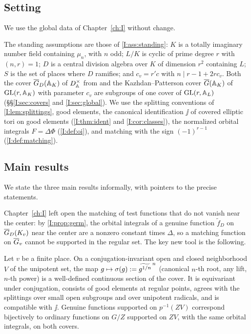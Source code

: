 \subsection{Setting}
We use the global data of Chapter~\ref{ch:I} without change.

The standing assumptions are those of \cref{I:ass:standing}: $K$ is a totally imaginary number field containing $\mu_n$, with $n$ odd; $L/K$ is cyclic of prime degree $r$ with $(n,r)=1$; $D$ is a central division algebra over $K$ of dimension $r^2$ containing $L$; $S$ is the set of places where $D$ ramifies; and $c_v=r'c$ with $n\mid r-1+2rc_v$. Both the cover $\overline{G}_D(\mathbb{A}_K)$ of $D^\times_{\mathbb{A}}$ from \cite[\S6]{JC26a} and the Kazhdan--Patterson cover $\overline{G}(\mathbb{A}_K)$ of $\mathrm{GL}(r,\mathbb{A}_K)$ with parameter $c_v$ are subgroups of one cover of $\mathrm{GL}(r,\mathbb{A}_L)$ (\S\S\ref{I:sec:covers} and \ref{I:sec:global}). We use the splitting conventions of \cref{I:lem:splittings}, good elements, the canonical identification $\jj$ of covered elliptic tori on good elements (\cref{I:thm:ident} and \cref{I:cor:classes}), the normalized orbital integrals $F=\Delta\Phi$ (\cref{I:def:oi}), and matching with the sign $(-1)^{r-1}$ (\cref{I:def:matching}).

\subsection{Main results}\label{II:subsec:main}
We state the three main results informally, with pointers to the precise statements.

Chapter~\ref{ch:I} left open the matching of test functions that do not vanish near the center: by \cref{I:prop:germ}, the orbital integrals of a genuine function $\tilde f_D$ on $\overline{G}_D(K_v)$ near the center are a nonzero constant times $\Delta$, so a matching function on $\overline{G}_v$ cannot be supported in the regular set. The key new tool is the following.

\begin{theoremD}
Let $v$ be a finite place. On a conjugation-invariant open and closed neighborhood $V$ of the unipotent set, the map $g\mapsto\sigma(g):=\widetilde{g^{1/n}}^{\,n}$ (canonical $n$-th root, any lift, $n$-th power) is a well-defined continuous section of the cover. It is equivariant under conjugation, consists of good elements at regular points, agrees with the splittings over small open subgroups and over unipotent radicals, and is compatible with $\jj$. Genuine functions supported on $p^{-1}(ZV)$ correspond bijectively to ordinary functions on $G/Z$ supported on $ZV$, with the same orbital integrals, on both covers.
\end{theoremD}

